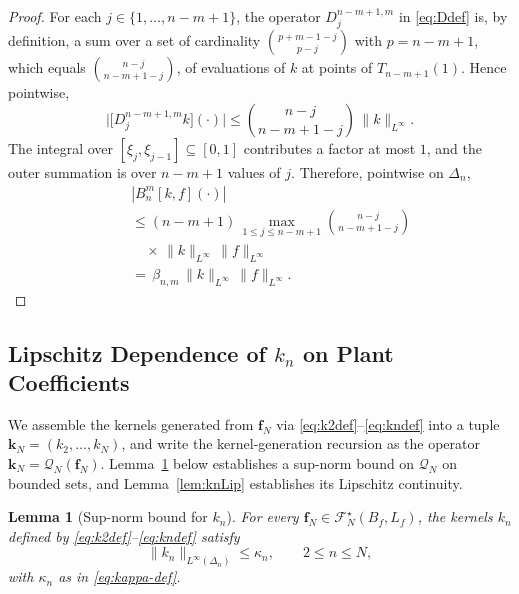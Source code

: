 \documentclass[twocolumn,amsthm]{autart}
\newcommand{\Linf}{L^\infty}
\theoremstyle{plain}
\newtheorem{lemma}{Lemma}
\theoremstyle{definition}
\begin{document}
\begin{proof}
For each $j\in\{1,\ldots,n-m+1\}$, the operator $D_j^{n-m+1,m}$ in \eqref{eq:Ddef} is, by definition, a sum over a set of cardinality $\binom{p+m-1-j}{p-j}$ with $p = n-m+1$, which equals $\binom{n-j}{n-m+1-j}$, of evaluations of $k$ at points of $T_{n-m+1}(1)$. Hence pointwise,
\begin{equation}
\bigl|\bigl[D_j^{n-m+1,m}k\bigr](\cdot)\bigr|
\le \binom{n-j}{n-m+1-j}\,\|k\|_{\Linf}.
\label{eq:Dbnd}
\end{equation}
The integral over $[\xi_j,\xi_{j-1}]\subseteq[0,1]$ contributes a factor at most $1$, and the outer summation is over $n-m+1$ values of $j$. Therefore, pointwise on $\Delta_n$,
\begin{eqnarray}
&& |B_n^m[k,f](\cdot)| \nonumber \\
&& \le (n-m+1)\,\max_{1\le j\le n-m+1}\binom{n-j}{n-m+1-j} \nonumber \\
&& \quad \times\, \|k\|_{\Linf}\,\|f\|_{\Linf} \nonumber \\
&& =\, \beta_{n,m}\,\|k\|_{\Linf}\,\|f\|_{\Linf}.
\label{eq:Bbnd-pw}
\end{eqnarray}
\end{proof}

\subsection{Lipschitz Dependence of $k_n$ on Plant Coefficients}
\label{sec:knLip}

We assemble the kernels generated from $\mathbf{f}_N$ via \eqref{eq:k2def}--\eqref{eq:kndef} into a tuple $\mathbf{k}_N = (k_2, \ldots, k_N)$, and write the kernel-generation recursion as the operator $\mathbf{k}_N = \mathcal{Q}_N(\mathbf{f}_N)$.
Lemma~\ref{lem:knBound} below establishes a sup-norm bound on $\mathcal{Q}_N$ on bounded sets, and Lemma~\ref{lem:knLip} establishes its Lipschitz continuity.

\begin{lemma}[Sup-norm bound for $k_n$]
\label{lem:knBound}
For every $\mathbf{f}_N\in\mathcal{F}_N^\star(B_f,L_f)$, the kernels $k_n$ defined by \eqref{eq:k2def}--\eqref{eq:kndef} satisfy
\begin{equation}
\|k_n\|_{\Linf(\Delta_n)} \le \kappa_n,
\qquad 2\le n\le N,
\label{eq:knBound}
\end{equation}
with $\kappa_n$ as in \eqref{eq:kappa-def}.
\end{lemma}
\end{document}
